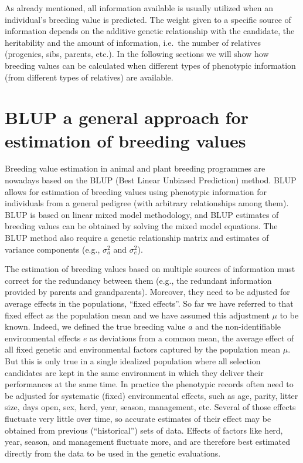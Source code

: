 \documentclass[
]{article}
\begin{document}
As already mentioned, all information available is usually utilized when an individual's breeding value is predicted. The weight given to a specific source of information depends on the additive genetic relationship with the candidate, the heritability and the amount of information, i.e.~the number of relatives (progenies, sibs, parents, etc.). In the following sections we will show how breeding values can be calculated when different types of phenotypic information (from different types of relatives) are available.

\section{BLUP a general approach for estimation of breeding values}\label{blup-a-general-approach-for-estimation-of-breeding-values}

Breeding value estimation in animal and plant breeding programmes are nowadays based on the BLUP (Best Linear Unbiased Prediction) method. BLUP allows for estimation of breeding values using phenotypic information for individuals from a general pedigree (with arbitrary relationships among them). BLUP is based on linear mixed model methodology, and BLUP estimates of breeding values can be obtained by solving the mixed model equations. The BLUP method also require a genetic relationship matrix and estimates of variance components (e.g., \(\sigma_a^2\) and \(\sigma_e^2\)).

The estimation of breeding values based on multiple sources of information must correct for the redundancy between them (e.g., the redundant information provided by parents and grandparents). Moreover, they need to be adjusted for average effects in the populations, ``fixed effects''. So far we have referred to that fixed effect as the population mean and we have assumed this adjustment \(\mu\) to be known. Indeed, we defined the true breeding value \(a\) and the non-identifiable environmental effects \(e\) as deviations from a common mean, the average effect of all fixed genetic and environmental factors captured by the population mean \(\mu\). But this is only true in a single idealized population where all selection candidates are kept in the same environment in which they deliver their performances at the same time. In practice the phenotypic records often need to be adjusted for systematic (fixed) environmental effects, such as age, parity, litter size, days open, sex, herd, year, season, management, etc. Several of those effects fluctuate very little over time, so accurate estimates of their effect may be obtained from previous (``historical'') sets of data. Effects of factors like herd, year, season, and management fluctuate more, and are therefore best estimated directly from the data to be used in the genetic evaluations.
\end{document}
